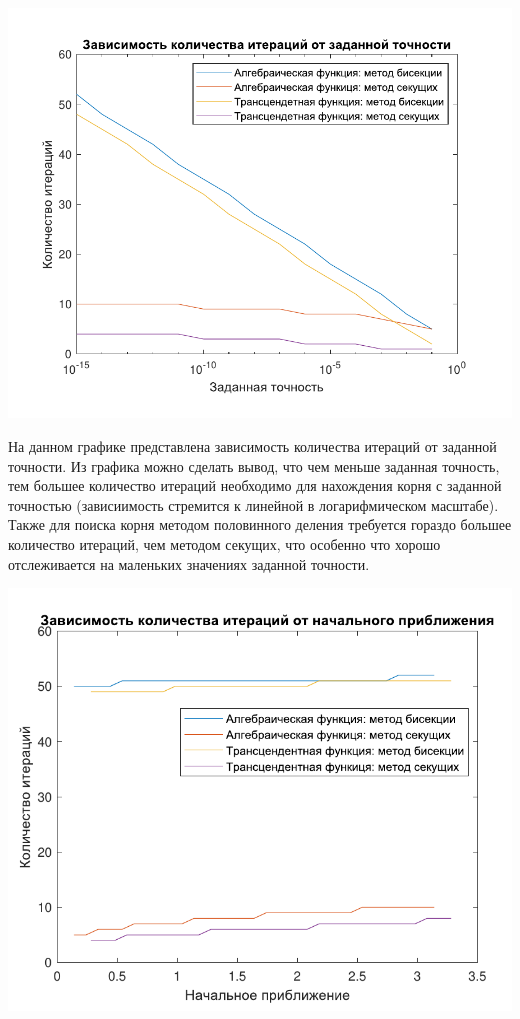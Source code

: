 \includegraphics[scale=0.75]{5.pdf}

На данном графике представлена зависимость количества итераций от заданной точности. Из графика можно сделать вывод, что чем меньше заданная точность, тем большее количество итераций необходимо для нахождения корня с заданной точностью (зависиимость стремится к линейной в логарифмическом масштабе). Также для поиска корня методом половинного деления требуется гораздо большее количество итераций, чем методом секущих, что особенно что хорошо отслеживается на маленьких значениях заданной точности. 

\includegraphics[scale=0.75]{6.pdf}

